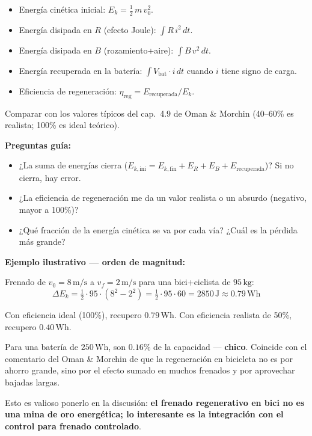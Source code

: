 \documentclass[11pt,a4paper]{article}
\newcommand{\unit}[1]{\,\mathrm{#1}}
\begin{document}
\begin{itemize}
    \item Energía cinética inicial: $E_k = \tfrac{1}{2}\,m\,v_0^2$.
    \item Energía disipada en $R$ (efecto Joule): $\int R\,i^2\,dt$.
    \item Energía disipada en $B$ (rozamiento+aire): $\int B\,v^2\,dt$.
    \item Energía recuperada en la batería: $\int V_{\text{bat}}\cdot i\,dt$ cuando $i$ tiene signo de carga.
    \item Eficiencia de regeneración: $\eta_{\text{reg}} = E_{\text{recuperada}} / E_k$.
\end{itemize}

Comparar con los valores típicos del cap.~4.9 de Oman \& Morchin (40--60\% es realista; 100\% es ideal teórico).

\begin{guia}
\textbf{Preguntas guía:}
\begin{itemize}
    \item ¿La suma de energías cierra ($E_{k,\text{ini}} = E_{k,\text{fin}} + E_R + E_B + E_{\text{recuperada}}$)? Si no cierra, hay error.
    \item ¿La eficiencia de regeneración me da un valor realista o un absurdo (negativo, mayor a 100\%)?
    \item ¿Qué fracción de la energía cinética se va por cada vía? ¿Cuál es la pérdida más grande?
\end{itemize}
\end{guia}

\begin{ejemplo}
\textbf{Ejemplo ilustrativo --- orden de magnitud:}

Frenado de $v_0 = 8\unit{m/s}$ a $v_f = 2\unit{m/s}$ para una bici+ciclista de $95\unit{kg}$:
\[
\Delta E_k = \tfrac{1}{2} \cdot 95 \cdot (8^2 - 2^2) = \tfrac{1}{2} \cdot 95 \cdot 60 = 2850\unit{J} \approx 0.79\unit{Wh}
\]

Con eficiencia ideal (100\%), recupero $0.79\unit{Wh}$. Con eficiencia realista de 50\%, recupero $0.40\unit{Wh}$.

Para una batería de $250\unit{Wh}$, son $0.16\%$ de la capacidad --- \textbf{chico}. Coincide con el comentario del Oman \& Morchin de que la regeneración en bicicleta no es por ahorro grande, sino por el efecto sumado en muchos frenados y por aprovechar bajadas largas.

Esto es valioso ponerlo en la discusión: \textbf{el frenado regenerativo en bici no es una mina de oro energética; lo interesante es la integración con el control para frenado controlado}.
\end{ejemplo}
\end{document}
